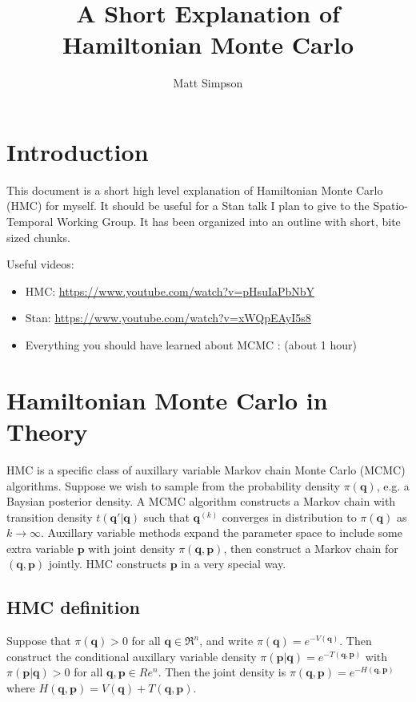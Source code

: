 \documentclass{article}
\title{A Short Explanation of Hamiltonian Monte Carlo}
\author{Matt Simpson}
\begin{document}
\maketitle

\section{Introduction}
This document is a short high level explanation of Hamiltonian Monte Carlo (HMC) for myself. It should be useful for a Stan talk I plan to give to the Spatio-Temporal Working Group. It has been organized into an outline with short, bite sized chunks.

Useful videos: 
\begin{itemize}
\item HMC: \url{https://www.youtube.com/watch?v=pHsuIaPbNbY}
\item Stan: \url{https://www.youtube.com/watch?v=xWQpEAyI5s8}
\item Everything you should have learned about MCMC : 
(about 1 hour)
\end{itemize}

\section{Hamiltonian Monte Carlo in Theory}
HMC is a specific class of auxillary variable Markov chain Monte Carlo (MCMC) algorithms. Suppose we wish to sample from the probability density $\pi(\bm{q})$, e.g. a Baysian posterior density. A MCMC algorithm constructs a Markov chain with transition density $t(\bm{q}'|\bm{q})$ such that $\bm{q}^{(k)}$ converges in distribution to $\pi(\bm{q})$ as $k\to \infty$. Auxillary variable methods expand the parameter space to include some extra variable $\bm{p}$ with joint density $\pi(\bm{q},\bm{p})$, then construct a Markov chain for $(\bm{q}, \bm{p})$ jointly. HMC constructs $\bm{p}$ in a very special way.

\subsection{HMC definition}

Suppose that $\pi(\bm{q}) > 0$ for all $\bm{q} \in \Re^n$, and write $\pi(\bm{q}) = e^{-V(\bm{q})}$. Then construct the conditional auxillary variable density $\pi(\bm{p}|\bm{q}) = e^{-T(\bm{q},\bm{p})}$ with $\pi(\bm{p}|\bm{q}) > 0$ for all $\bm{q}, \bm{p} \in Re^n$. Then the joint density is $\pi(\bm{q}, \bm{p}) = e^{-H(\bm{q}, \bm{p})}$ where $H(\bm{q}, \bm{p}) = V(\bm{q}) + T(\bm{q}, \bm{p})$.
\end{document}
